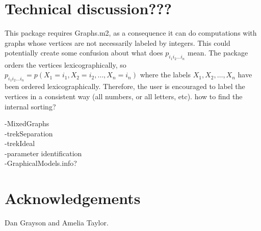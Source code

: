 \documentclass{article}
\theoremstyle{definition}
\begin{document}
\section{Technical discussion???}
This package requires Graphs.m2, as a consequence it can do
computations with graphs whose vertices are not necessarily labeled by
integers. This could potentially create some confusion about what does
$p_{i_1i_2\ldots i_n}$  mean. The package orders the vertices lexicographically, so
$p_{i_1i_2\ldots i_n}  = p(X_1 = i_1, X_2 = i_2, \ldots, X_n  = i_n)$ where the labels
$X_1,X_2,\ldots,X_n$  have been ordered lexicographically. Therefore, the user
is encouraged to label the vertices in a consistent way (all numbers,
or all letters, etc). how to find the internal sorting?

-MixedGraphs \\
-trekSeparation \\
-trekIdeal \\
-parameter identification \\
-GraphicalModels.info? \\

\section*{Acknowledgements} Dan Grayson and Amelia Taylor.
\end{document}
